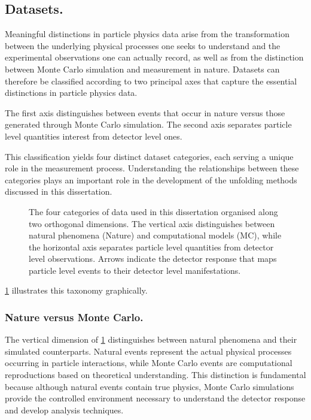 \begin{definition}
\subsection{Datasets.}
    Meaningful distinctions in particle physics data arise from the transformation between the underlying physical processes one seeks to understand and the experimental observations one can actually record, as well as from the distinction between Monte Carlo simulation and measurement in nature.
    Datasets can therefore be classified according to two principal axes that capture the essential distinctions in particle physics data.
    
    The first axis distinguishes between events that occur in nature versus those generated through Monte Carlo simulation.
    The second axis separates particle level quantities interest from detector level ones.

    This classification yields four distinct dataset categories, each serving a unique role in the measurement process.
    Understanding the relationships between these categories plays an important role in the development of the unfolding methods discussed in this dissertation.
    \begin{figure}
    \centering
    \resizebox{\linewidth}{!}{}
    \caption[Taxonomy of datasets used]{The four categories of data used in this dissertation organised along two orthogonal dimensions.
    The vertical axis distinguishes between natural phenomena (Nature) and computational models (MC), while the horizontal axis separates particle level quantities from detector level observations.
    Arrows indicate the detector response that maps particle level events to their detector level manifestations.
    }
    \label{fig:dataset-taxonomy}
    \end{figure}

\cref{fig:dataset-taxonomy} illustrates this taxonomy graphically.

    \subsubsection{Nature versus Monte Carlo.}
        The vertical dimension of \cref{fig:dataset-taxonomy} distinguishes between natural phenomena and their simulated counterparts.
        Natural events represent the actual physical processes occurring in particle interactions, while Monte Carlo events are computational reproductions based on theoretical understanding.
        This distinction is fundamental because although natural events contain true physics, Monte Carlo simulations provide the controlled environment necessary to understand the detector response and develop analysis techniques.


\end{definition}
